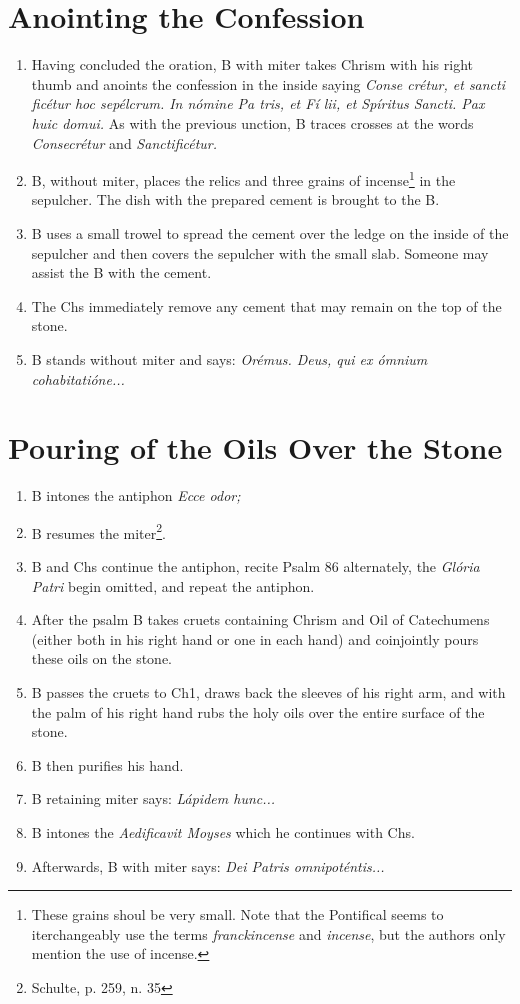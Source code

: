 \documentclass[letterpaper, twocolumn]{article}
\begin{document}
\section*{Anointing the Confession}
\begin{enumerate}
	\item Having concluded the oration, B with miter takes Chrism with his right thumb and anoints the confession in the inside saying \textit{Conse  crétur, et sancti  ficétur hoc sepélcrum. In nómine Pa  tris, et Fí  lii, et Spíritus  Sancti. Pax huic domui.} As with the previous unction, B traces crosses at the words \textit{Consecrétur} and \textit{Sanctificétur.}
	\item B, without miter, places the relics and three grains of incense\footnote{These grains shoul be very small. Note that the Pontifical seems to iterchangeably use the terms \textit{franckincense} and \textit{incense}, but the authors only mention the use of incense.} in the sepulcher. The dish with the prepared cement is brought to the B.
	\item B uses a small trowel to spread the cement over the ledge on the inside of the sepulcher and then covers the sepulcher with the small slab. Someone may assist the B with the cement.
	\item The Chs immediately remove any cement that may remain on the top of the stone.
	\item B stands without miter and says: \textit{Orémus. Deus, qui ex ómnium cohabitatióne...}
\end{enumerate}
\section*{Pouring of the Oils Over the Stone}
\begin{enumerate}
	\item B intones the antiphon \textit{Ecce odor;} 
	\item B resumes the miter\footnote{Schulte, p. 259, n. 35}.
	\item B and Chs continue the antiphon, recite Psalm 86 alternately, the \textit{Glória Patri} begin omitted, and repeat the antiphon.
	\item After the psalm B takes cruets containing Chrism and Oil of Catechumens (either both in his right hand or one in each hand) and coinjointly pours these oils on the stone.
	\item B passes the cruets to Ch1, draws back the sleeves of his right arm, and with the palm of his right hand rubs the holy oils over the entire surface of the stone.
	\item B then purifies his hand.
	\item B retaining miter says: \textit{Lápidem hunc...}
	\item B intones the \textit{Aedificavit Moyses} which he continues with Chs.
	\item Afterwards, B with miter says: \textit{Dei Patris omnipoténtis...}
\end{enumerate}
\end{document}
